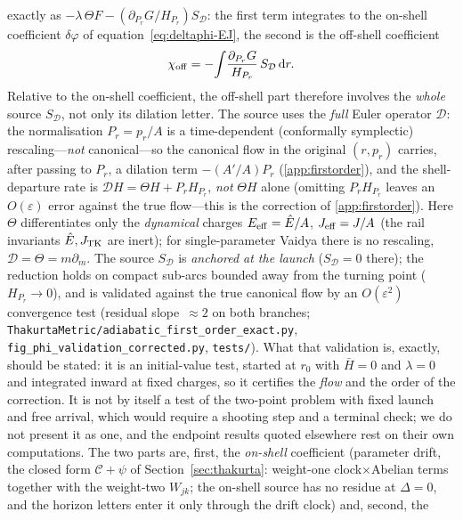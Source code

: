 \documentclass[12pt]{iopart}
\theoremstyle{plain}
\theoremstyle{definition}
\theoremstyle{remark}
\newcommand{\Ehat}{\hat E}
\newcommand{\dd}{\mathrm{d}}
\begin{document}
exactly as $-\lambda\,\Theta F-(\partial_{P_r}G/H_{P_r})S_{\mathcal D}$: the first term
integrates to the on-shell coefficient $\delta\varphi$ of
equation~\eqref{eq:deltaphi-EJ}, the second is the off-shell coefficient
\begin{equation}
    \chi_{\rm off}=-\!\int\!\frac{\partial_{P_r}G}{H_{P_r}}\,S_{\mathcal D}\,\dd r .
    \label{eq:chi-off}
\end{equation}
Relative to the on-shell coefficient, the off-shell part therefore involves the
\emph{whole} source $S_{\mathcal D}$, not only its dilation letter. The source uses the \emph{full} Euler
operator $\mathcal D$: the normalisation $P_r=p_r/A$ is a time-dependent (conformally
symplectic) rescaling---\emph{not} canonical---so the canonical flow in the original
$(r,p_r)$ carries, after passing to $P_r$, a dilation term
$-\!\left(A'/A\right)P_r$ (\ref{app:firstorder}), and the shell-departure rate is $\mathcal D H=\Theta
H+P_r H_{P_r}$, \emph{not} $\Theta H$ alone (omitting $P_r H_{P_r}$ leaves an
$O(\varepsilon)$ error against the true flow---this is the correction of
\ref{app:firstorder}). Here $\Theta$ differentiates only the \emph{dynamical}
charges $E_{\rm eff}=\Ehat/A$, $J_{\rm eff}=J/A$ (the rail invariants $\Ehat,J_{\rm TK}$
are inert); for single-parameter Vaidya there is no rescaling, $\mathcal D=\Theta=m\partial_m$.
The source $S_{\mathcal D}$ is \emph{anchored at the launch} ($S_{\mathcal D}=0$ there); the reduction holds on compact sub-arcs bounded away from the
turning point ($H_{P_r}\to0$), and is validated against the true canonical flow by an
$O(\varepsilon^2)$ convergence test (residual slope~$\approx2$ on both branches;
\texttt{ThakurtaMetric/adiabatic\_first\_order\_exact.py},
\texttt{fig\_phi\_validation\_corrected.py}, \texttt{tests/}). What
that validation is, exactly, should be stated: it is an initial-value test, started
at $r_0$ with $\bar H=0$ and $\lambda=0$ and integrated inward at fixed charges,
so it certifies the \emph{flow} and the order of the correction. It is not by
itself a test of the two-point problem with fixed launch and free arrival, which
would require a shooting step and a terminal check; we do not present it as one,
and the endpoint results quoted elsewhere rest on their own computations. The two
parts are, first, the \emph{on-shell} coefficient (parameter drift, the closed form
$\mathcal C+\psi$ of Section~\ref{sec:thakurta}: weight-one clock$\times$Abelian terms
together with the weight-two $W_{jk}$; the on-shell source has no residue at $\Delta=0$,
and the horizon letters enter it only through the drift clock) and, second, the
\end{document}
